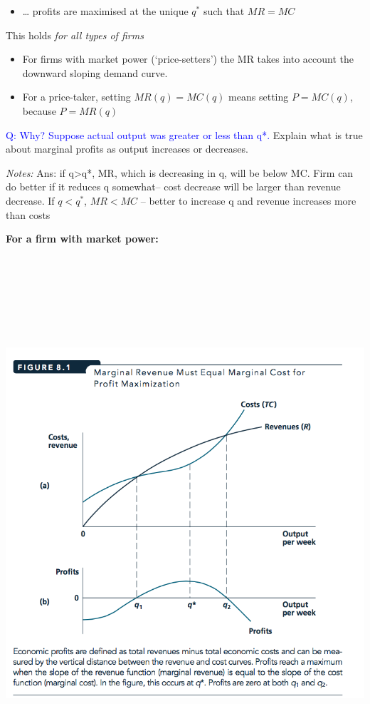 \documentclass[]{article}
\providecommand{\tightlist}{%
  \setlength{\itemsep}{0pt}\setlength{\parskip}{0pt}}
\begin{document}
\begin{itemize}
\tightlist
\item
  \ldots{} profits are maximised at the unique \(q^*\) such that \(MR=MC\)
\end{itemize}

\bigskip

This holds \emph{for all types of firms}

\begin{itemize}
\item
  For firms with market power (`price-setters') the MR takes into account the downward sloping demand curve.
\item
  For a price-taker, setting \(MR(q)=MC(q)\) means setting \(P=MC(q)\), because \(P=MR(q)\)
\end{itemize}

\textcolor{blue}{Q:  Why? Suppose actual output was greater or less than q*.}
Explain what is true about marginal profits as output increases or decreases.

\emph{Notes:}
Ans: if q\textgreater{}q*, MR, which is decreasing in q, will be below MC.
Firm can do better if it reduces q somewhat-- cost decrease will be larger than revenue decrease.
If \(q<q^{\ast}\), \(MR<MC\) -- better to increase q and revenue increases more than costs

\textbf{For a firm with market power:}

\includegraphics[height=7.8in]{picsfigs/fig8-1.png}
\end{document}

